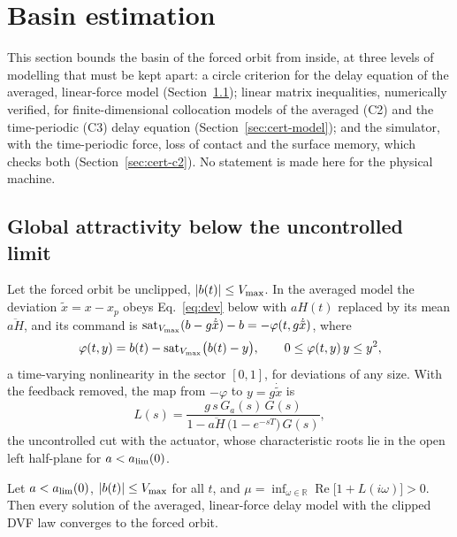 \section{Basin estimation}\label{sec:certificates}

This section bounds the basin of the forced orbit from inside, at three levels of modelling that must be kept apart:\label{sec:cert-levels} a circle criterion for the delay equation of the averaged, linear-force model (Section~\ref{sec:cert-global}); linear matrix inequalities, numerically verified, for finite-dimensional collocation models of the averaged (C2) and the time-periodic (C3) delay equation (Section~\ref{sec:cert-model}); and the simulator, with the time-periodic force, loss of contact and the surface memory, which checks both (Section~\ref{sec:cert-c2}). No statement is made here for the physical machine.

\subsection{Global attractivity below the uncontrolled limit}\label{sec:cert-global}

Let the forced orbit be unclipped, $\lvert b(t)\rvert\le V_{\max}$. In the averaged model the deviation $\tilde x=x-x_p$ obeys Eq.~\eqref{eq:dev} below with $aH(t)$ replaced by its mean $\overline{aH}$, and its command is $\operatorname{sat}_{V_{\max}}(b-g\dot{\tilde x})-b=-\varphi(t,g\dot{\tilde x})$, where
\begin{equation}\label{eq:phi-sector}
  \varphi(t,y)=b(t)-\operatorname{sat}_{V_{\max}}\bigl(b(t)-y\bigr),\qquad 0\le\varphi(t,y)\,y\le y^2 ,
\end{equation}
a time-varying nonlinearity in the sector $[0,1]$, for deviations of any size. With the feedback removed, the map from $-\varphi$ to $y=g\dot{\tilde x}$ is
\begin{equation}\label{eq:Ls}
  L(s)=\frac{g\,s\,G_a(s)\,G(s)}{1-\overline{aH}\,\bigl(1-e^{-sT}\bigr)\,G(s)} ,
\end{equation}
the uncontrolled cut with the actuator, whose characteristic roots lie in the open left half-plane for $a<a_{\lim}(0)$.

\begin{proposition}\label{prop:circle}
Let $a<a_{\lim}(0)$, $\lvert b(t)\rvert\le V_{\max}$ for all $t$, and $\mu=\inf_{\omega\in\mathbb R}\operatorname{Re}\bigl[1+L(i\omega)\bigr]>0$. Then every solution of the averaged, linear-force delay model with the clipped DVF law converges to the forced orbit.
\end{proposition}

